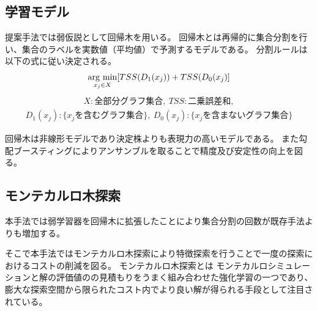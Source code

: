 \documentclass[a4paper,10.5pt]{jsarticle}           %
\newcommand{\argmin}{\mathop{\rm arg~min}\limits}
\begin{document}
\subsection{学習モデル}
提案手法では弱仮説として回帰木を用いる。
回帰木とは再帰的に集合分割を行い、集合のラベルを実数値（平均値）で予測するモデルである。
分割ルールは以下の式に従い決定される。
\begin{align}
	\argmin_{x_j \in X} [TSS(D_{1}(x_j)) + TSS(D_{0}(x_{j})] \nonumber
\end{align}
\footnotesize
\begin{align}
	X:全部分グラフ集合,\ TSS: 二乗誤差和, \nonumber
\end{align}
\begin{align}
	 D_{1}(x_j):\{x_{j}を含むグラフ集合\},\ D_{0}(x_j):\{x_{j}を含まないグラフ集合\}\nonumber
\end{align}
\normalsize

回帰木は非線形モデルであり決定株よりも表現力の高いモデルである。
また勾配ブースティングによりアンサンブルを取ることで精度及び安定性の向上を図る。

\subsection{モンテカルロ木探索}
本手法では弱学習器を回帰木に拡張したことにより集合分割の回数が既存手法よりも増加する。

そこで本手法ではモンテカルロ木探索により特徴探索を行うことで一度の探索におけるコストの削減を図る。
モンテカルロ木探索\cite{mcts_survey}\cite{fuse}とは
モンテカルロシミュレーションと解の評価値のの見積もりをうまく組み合わせた強化学習の一つであり、
膨大な探索空間から限られたコスト内でより良い解が得られる手段として注目されている。
\end{document}
